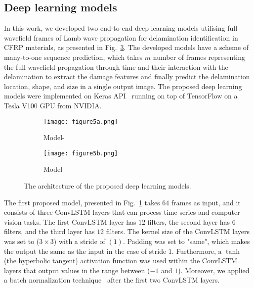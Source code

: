 \subsection{Deep learning models}
\label{proposed_approach}
\begin{sloppypar}
	In this work, we developed two end-to-end deep learning models utilising full wavefield frames of Lamb wave propagation for delamination identification in CFRP materials, as presented in Fig.~\ref{fig:proposed_models}.
	The developed models have a scheme of many-to-one sequence prediction, which takes \(m\) number of frames representing the full wavefield propagation through time and their interaction with the delamination to extract the damage features and finally predict the delamination location, shape, and size in a single output image.
	The proposed deep learning models were implemented on Keras API~\cite{chollet2015keras} running on top of TensorFlow on a Tesla V100 GPU from NVIDIA.
	\begin{figure} [!ht]
		\centering
		\begin{subfigure}[b]{0.49\textwidth}
			\centering
			\texttt{[image: figure5a.png]}
			\caption{Model-} %
			\label{fig:convlstm_model}
		\end{subfigure}
		\hfill
		\begin{subfigure}[b]{0.49\textwidth}
			\centering
			\texttt{[image: figure5b.png]}
			\caption{Model-} %
			\label{fig:AE_convlstm}
		\end{subfigure}
		\caption{The architecture of the proposed deep learning models.}
		\label{fig:proposed_models}
	\end{figure} 
	
	The first proposed model, presented in Fig.~\ref{fig:convlstm_model} takes \(64\) frames as input, and it consists of three ConvLSTM layers that can process time series and computer vision tasks.
	The first ConvLSTM layer has \(12\) filters, the second layer has \(6\) filters, and the third layer has \(12\) filters.
	The kernel size of the ConvLSTM layers was set to (\(3\times3\)) with a stride of \((1)\). 
	Padding was set to "same", which makes the output the same as the input in the case of stride \(1\).
	Furthermore, a \(\tanh\) (the hyperbolic tangent) activation function was used within the ConvLSTM layers that output values in the range between (\(-1\) and \(1\)).
	Moreover, we applied a batch normalization technique~\cite{Santurkar2018} after the first two ConvLSTM layers.
	

\end{sloppypar}
